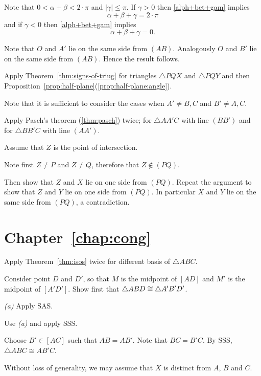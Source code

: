 Note that $0<\alpha+\beta<2\cdot\pi$ and $|\gamma|\le \pi$.
If $\gamma> 0$ then \ref{alph+bet+gam} implies
$$\alpha+\beta+\gamma=2\cdot\pi$$
and 
if $\gamma<0$ then \ref{alph+bet+gam} implies
$$\alpha+\beta+\gamma=0.$$


Note that $O$ and $A'$
lie on the same side from $(AB)$.
Analogously $O$ and $B'$
lie on the same side from $(AB)$.
Hence the result follows.


Apply Theorem~\ref{thm:signs-of-triug} for triangles $\triangle PQX$ and $\triangle PQY$ and then 
Proposition~\ref{prop:half-plane}(\ref{prop:half-plane:angle}).

Note that it is sufficient to consider the cases when $A'\ne B,C$ and $B'\ne A, C$.

Apply Pasch's theorem (\ref{thm:pasch}) twice;
for $\triangle AA'C$ with line $(BB')$
and for $\triangle BB'C$ with line $(AA')$.

Assume that $Z$ is the point of intersection.

Note first $Z\ne P$ and $Z\ne Q$,
therefore that $Z\notin (PQ)$.

Then show that $Z$ and $X$ lie on one side from $(PQ)$.
Repeat the argument to show that $Z$ and $Y$ lie on one side from $(PQ)$.
In particular $X$ and $Y$  lie on the same side from $(PQ)$, a contradiction.


\section*{Chapter~\ref{chap:cong}}
\setcounter{eqtn}{0}

Apply Theorem~\ref{thm:isos} twice for different basis of $\triangle ABC$.

Consider point $D$ and $D'$, so that 
$M$ is the midpoint of $[AD]$
and 
$M'$ is the midpoint of $[A'D']$.
Show first that $\triangle ABD\z\cong \triangle A'B'D'$.

 \textit{(a)} Apply SAS.

 Use \textit{(a)} and apply SSS.

Choose $B'\in [AC]$ such that $AB=AB'$.
Note that $BC=B'C$.
By SSS, 
 $\triangle ABC\cong AB'C$.

Without loss of generality, we may assume that $X$ is distinct from $A$, $B$ and $C$.

